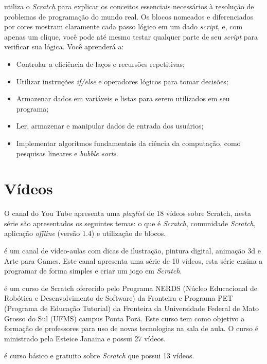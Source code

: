 \documentclass[12pt,fleqn]{book} %
\begin{document}
\textcite{marji2014aprenda} utiliza o \textit{Scratch} para explicar os conceitos essenciais necessários à resolução de problemas de programação do mundo real. Os blocos nomeados e diferenciados por cores mostram claramente cada passo lógico em um dado \textit{script}, e, com apenas um clique, você pode até mesmo testar qualquer parte de seu \textit{script} para verificar sua lógica. Você aprenderá a:

\begin{itemize}
	\item Controlar a eficiência de laços e recursões repetitivas;
	\item Utilizar instruções \textit{if/else} e operadores lógicos para tomar decisões;
	\item Armazenar dados em variáveis e listas para serem utilizados em seu programa;
	
	\item Ler, armazenar e manipular dados de entrada dos usuários;
	\item Implementar algoritmos fundamentais da ciência da computação, como pesquisas lineares e \textit{bubble sorts}.
\end{itemize}

\section{Vídeos}

O canal do You Tube \textcite{apensarem2018} apresenta uma \textit{playlist} de 18 vídeos sobre Scratch, nesta série são apresentados os seguintes temas: o que é \textit{Scratch}, comunidade \textit{Scratch}, aplicação \textit{offline} (versão 1.4) e utilização de blocos.
	
\textcite{ilustradicas2018} é um canal de vídeo-aulas com dicas de ilustração, pintura digital, animação 3d e Arte para Games. Este canal apresenta uma série de 10 vídeos, esta série ensina a programar de forma simples e criar um jogo em \textit{Scratch}. 
	
\textcite{cursocompleto2018} é um curso de Scratch oferecido pelo Programa NERDS (Núcleo Educacional de Robótica e Desenvolvimento de Software) da Fronteira e Programa PET (Programa de Educação Tutorial) da Fronteira da Universidade Federal de Mato Grosso do Sul (UFMS) campus Ponta Porã. Este curso tem como objetivo a formação de professores para uso de novas tecnologias na sala de aula. O curso é ministrado pela Esteice Janaina e possui 27 vídeos.
	
\textcite{cursoexcel2018} é curso básico e gratuito sobre \textit{Scratch} que possui 13 vídeos. 
	
\end{document}
